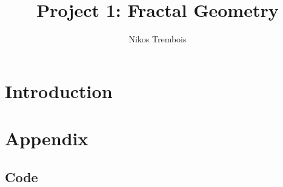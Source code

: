 \documentclass[letterpaper,11pt]{article}
\begin{document}
\title{Project 1: Fractal Geometry}
\author{Nikos Trembois}
\date{}
\maketitle

\newpage

\section{Introduction}

\section{Appendix}

\subsection{Code}
\end{document}
